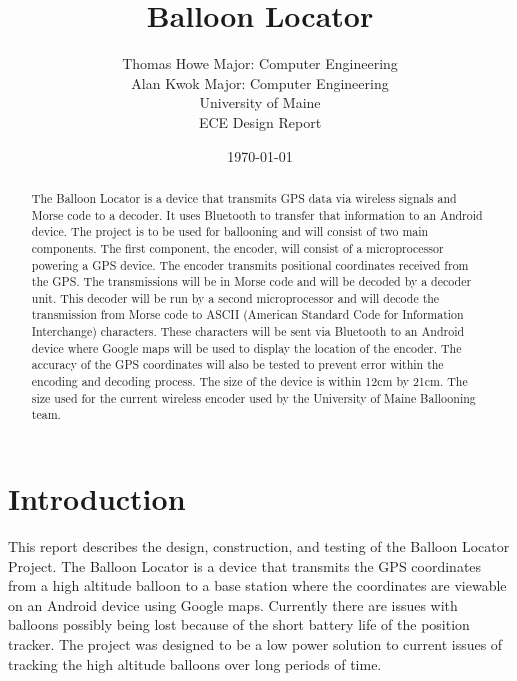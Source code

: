 \documentclass[12pt, letterpaper]{article}
\begin{document}
\begin{titlingpage}
\title{ \textbf{Balloon Locator} }
\author{Thomas Howe Major: Computer Engineering\\
Alan Kwok  Major: Computer Engineering\\ 
University of Maine\\
ECE Design Report
}
\date{\today}

\maketitle
\end{titlingpage}
\newpage


\begin{abstract}
The Balloon Locator is a device that transmits GPS data via wireless signals and Morse code to a decoder. It uses Bluetooth to transfer that information to an Android device. The project is to be used for ballooning and will consist of two main components. The first component, the encoder, will consist of a microprocessor powering a GPS device. The encoder transmits positional coordinates received from the GPS. The transmissions will be in Morse code and will be decoded by a decoder unit. This decoder will be run by a second microprocessor and will decode the transmission from Morse code to ASCII (American Standard Code for Information Interchange) characters. These characters will be sent via Bluetooth to an Android device where Google maps will be used to display the location of the encoder. The accuracy of the GPS coordinates will also be tested to prevent error within the encoding and decoding process. The size of the device is within 12cm by 21cm. The size used for the current wireless encoder used by the University of Maine Ballooning team.
\end{abstract}

\newpage

\tableofcontents
\newpage

\listoftables
\listoffigures
\newpage


\section{Introduction}
This report describes the design, construction, and testing of the Balloon Locator Project. The Balloon Locator is a device that transmits the GPS coordinates from a high altitude balloon to a base station where the coordinates are viewable on an Android device using Google maps. Currently there are issues with balloons possibly being lost because of the short battery life of the position tracker. The project was designed to be a low power solution to current issues of tracking the high altitude balloons over long periods of time. \\
\end{document}
